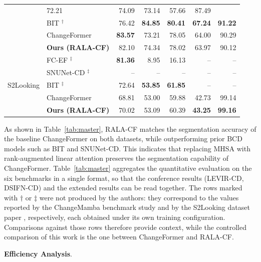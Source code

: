 \documentclass[runningheads]{llncs}
\newcommand{\journal}[1]{{\color{orange}#1}}
\begin{document}
\begin{table}
\begin{tabularx}{\textwidth}{|l|X|r|r|r|r|r|}
        & 72.21 & 74.09 & 73.14 & 57.66 & 87.49 \\
    & BIT \cite{Chen2022BIT}$^\dagger$
        & 76.42 & \textbf{84.85} & \textbf{80.41} & \textbf{67.24} & \textbf{91.22} \\
    & ChangeFormer \cite{Bandara2022ChangeFormer}
        & \textbf{83.57} & 73.21 & 78.05 & 64.00 & 90.29 \\
\rowcolor{pastelorange}
    & \textbf{Ours (RALA-CF)}
        & 82.10 & 74.34 & 78.02 & 63.97 & 90.12 \\
\hline
\multirow{5}{*}{S2Looking}
    & FC-EF \cite{Daudt2018SiamICIP}$^\ddagger$
        & \textbf{81.36} & 8.95 & 16.13 & -- & -- \\
    & SNUNet-CD \cite{Fang2021SNUNetCD}$^\ddagger$
        & -- & -- & -- & -- & -- \\
    & BIT \cite{Chen2022BIT}$^\ddagger$
        & 72.64 & \textbf{53.85} & \textbf{61.85} & -- & -- \\
    & ChangeFormer \cite{Bandara2022ChangeFormer}
        & 68.81 & 53.00 & 59.88 & 42.73 & 99.14 \\
\rowcolor{pastelorange}
    & \textbf{Ours (RALA-CF)}
        & 70.02 & 53.09 & 60.39 & \textbf{43.25} & \textbf{99.16} \\
\hline
\end{tabularx}
\end{table}

\noindent As shown in Table~\ref{tab:master}, RALA-CF matches the
segmentation accuracy of the baseline ChangeFormer on both datasets, while
outperforming prior BCD models such as BIT and SNUNet-CD. This indicates that
replacing MHSA with rank-augmented linear attention preserves the segmentation
capability of ChangeFormer.
\journal{Table~\ref{tab:master} aggregates the quantitative evaluation on the
six benchmarks in a single format, so that the conference results (LEVIR-CD,
DSIFN-CD) and the extended results can be read together. The rows marked with
$\dagger$ or $\ddagger$ were not produced by the authors: they correspond to
the values reported by the ChangeMamba benchmark study
\cite{Chen2024ChangeMamba} and by the S2Looking dataset paper
\cite{ShenS2Looking2021}, respectively, each obtained under its own training
configuration.
Comparisons against those rows therefore provide context, while the controlled
comparison of this work is the one between ChangeFormer and RALA-CF.}

\noindent \textbf{Efficiency Analysis}.
\end{document}
